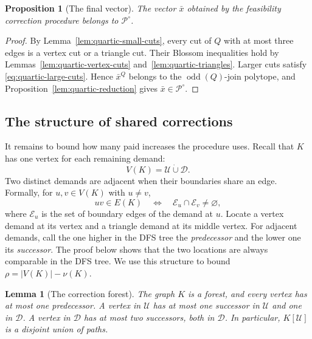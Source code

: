 \documentclass[11pt]{amsart}
\DeclareMathOperator{\odd}{odd}
\newcommand{\1}{\mathbbm{1}}
\newtheorem{lemma}[theorem]{Lemma}
\newtheorem{proposition}[theorem]{Proposition}
\begin{document}
\begin{proposition}[The final vector]
\label{prop:quartic-completed-vector}
The vector $\bar x$ obtained by the feasibility correction
procedure belongs to ${\mathcal P^\circ}$.
\end{proposition}

\begin{proof}
By Lemma~\ref{lem:quartic-small-cuts}, every cut of $Q$
with at most three edges is a vertex cut or a triangle
cut. Their Blossom inequalities hold by
Lemmas~\ref{lem:quartic-vertex-cuts}
and~\ref{lem:quartic-triangles}.
Larger cuts satisfy \eqref{eq:quartic-large-cuts}.
{Hence $\bar x^Q$ belongs to the
$\odd(Q)$-join polytope}, and
Proposition~\ref{lem:quartic-reduction} gives
$\bar x\in{\mathcal P^\circ}$.
\end{proof}

\subsection{The structure of shared corrections}

It remains to bound how many paid increases the procedure uses.
Recall that $K$ has one vertex for each remaining demand:
\[
 V(K)=\mathcal U\mathbin{\dot\cup}\mathcal D.
\]
Two distinct demands are adjacent when their boundaries share
an edge. Formally, for $u,v\in V(K)$ with $u\ne v$,
\[
 uv\in E(K)
 \quad\Longleftrightarrow\quad
 \mathcal E_u\cap\mathcal E_v\ne\varnothing,
\]
where $\mathcal E_u$ is the set of boundary edges of the demand
at $u$. Locate a vertex demand at its vertex and a triangle demand
at its middle vertex. For adjacent demands, call the one higher
in the DFS tree the \emph{predecessor} and the lower one its
\emph{successor}. The proof below shows that the two locations
are always comparable in the DFS tree.
We use this structure to bound $\rho=|V(K)|-\nu(K)$.

\begin{lemma}[The correction forest]
\label{lem:quartic-repair-forest}
The graph $K$ is a forest, and every vertex has at most one
predecessor. A vertex in $\mathcal U$ has at most one successor
in $\mathcal U$ and one in $\mathcal D$. A vertex in
$\mathcal D$ has at most two successors, both in $\mathcal D$.
In particular, $K[\mathcal U]$ is a disjoint union of paths.
\end{lemma}
\end{document}

